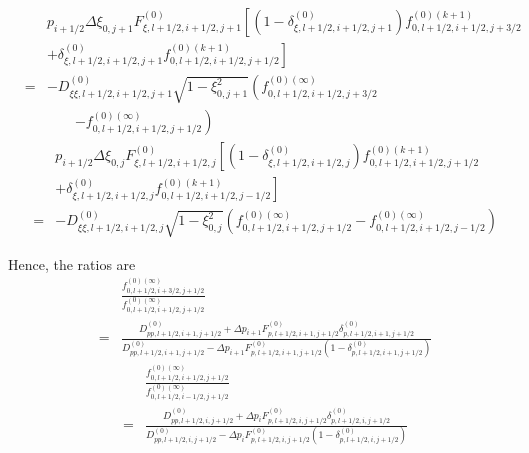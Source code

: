 \begin{eqnarray}
&&p_{i+1/2}\Delta \xi _{0,j+1}F_{\xi ,l+1/2,i+1/2,j+1}^{\left( 0\right)
}\left[ \left( 1-\delta _{\xi ,l+1/2,i+1/2,j+1}^{\left( 0\right) }\right)
f_{0,l+1/2,i+1/2,j+3/2}^{\left( 0\right) (k+1)}\right.  \nonumber \\
&&\left. +\delta _{\xi ,l+1/2,i+1/2,j+1}^{\left( 0\right)
}f_{0,l+1/2,i+1/2,j+1/2}^{\left( 0\right) (k+1)}\right]  \nonumber \\
&=&-D_{\xi \xi ,l+1/2,i+1/2,j+1}^{\left( 0\right) }\sqrt{1-\xi _{0,j+1}^{2}}%
\left( f_{0,l+1/2,i+1/2,j+3/2}^{\left( 0\right) (\infty
)}\right.\nonumber\\&&\qquad\left.-f_{0,l+1/2,i+1/2,j+1/2}^{\left(
0\right) (\infty )}\right)
\end{eqnarray}
\begin{eqnarray}
&&p_{i+1/2}\Delta \xi _{0,j}F_{\xi ,l+1/2,i+1/2,j}^{\left( 0\right) }\left[
\left( 1-\delta _{\xi ,l+1/2,i+1/2,j}^{\left( 0\right) }\right)
f_{0,l+1/2,i+1/2,j+1/2}^{\left( 0\right) (k+1)}\right.  \nonumber \\
&&\left. +\delta _{\xi ,l+1/2,i+1/2,j}^{\left( 0\right)
}f_{0,l+1/2,i+1/2,j-1/2}^{\left( 0\right) (k+1)}\right]  \nonumber \\
&=&-D_{\xi \xi ,l+1/2,i+1/2,j}^{\left( 0\right) }\sqrt{1-\xi _{0,j}^{2}}%
\left( f_{0,l+1/2,i+1/2,j+1/2}^{\left( 0\right) (\infty
)}-f_{0,l+1/2,i+1/2,j-1/2}^{\left( 0\right) (\infty )}\right)
\end{eqnarray}

Hence, the ratios are
\begin{eqnarray}
&&\frac{f_{0,l+1/2,i+3/2,j+1/2}^{\left( 0\right) (\infty )}}{
f_{0,l+1/2,i+1/2,j+1/2}^{\left( 0\right) (\infty )}}  \nonumber \\
&=&\frac{D_{pp,l+1/2,i+1,j+1/2}^{\left( 0\right) }+\Delta
p_{i+1}F_{p,l+1/2,i+1,j+1/2}^{\left( 0\right) }\delta
_{p,l+1/2,i+1,j+1/2}^{\left( 0\right) }}{D_{pp,l+1/2,i+1,j+1/2}^{\left(
0\right) }-\Delta p_{i+1}F_{p,l+1/2,i+1,j+1/2}^{\left( 0\right) }\left(
1-\delta _{p,l+1/2,i+1,j+1/2}^{\left( 0\right) }\right) }
\end{eqnarray}
\begin{eqnarray}
&&\frac{f_{0,l+1/2,i+1/2,j+1/2}^{\left( 0\right) (\infty )}}{
f_{0,l+1/2,i-1/2,j+1/2}^{\left( 0\right) (\infty )}}  \nonumber \\
&=&\frac{D_{pp,l+1/2,i,j+1/2}^{\left( 0\right) }+\Delta
p_{i}F_{p,l+1/2,i,j+1/2}^{\left( 0\right) }\delta _{p,l+1/2,i,j+1/2}^{\left(
0\right) }}{D_{pp,l+1/2,i,j+1/2}^{\left( 0\right) }-\Delta
p_{i}F_{p,l+1/2,i,j+1/2}^{\left( 0\right) }\left( 1-\delta
_{p,l+1/2,i,j+1/2}^{\left( 0\right) }\right) }
\end{eqnarray}

